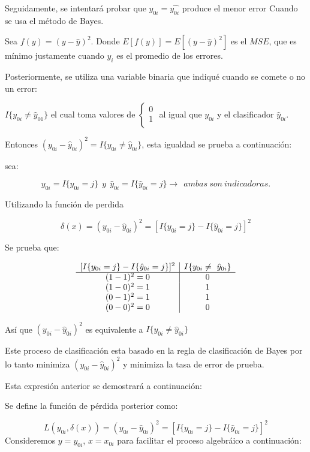 \documentclass[
  12pt,
  letterpaper,
]{article}
\begin{document}
Seguidamente, se intentará probar que \(y_{0i} = \hat{y_{0i}}\) produce
el menor error Cuando se usa el método de Bayes.

Sea \(f(y) = (y - \hat{y})^2\). Donde \(E[f(y)] = E[(y - \hat{y})^2]\)
es el \(MSE\), que es mínimo justamente cuando \(y_i\) es el promedio de
los errores.

Posteriormente, se utiliza una variable binaria que indiqué cuando se
comete o no un error:

\(I\{y_{0i} \neq \hat{y}_{01}\}\) el cual toma valores de
\(\left\{ \begin{aligned} 0\\ 1\\ \end{aligned} \right.\) al igual que
\(y_{0i}\) y el clasificador \(\hat{y}_{0i}\).

Entonces \((y_{0i} - \hat{y}_{0i})^2 = I\{y_{0i} \neq \hat{y}_{0i}\}\),
esta igualdad se prueba a continuación:

sea:

\[y_{0i} = I\{y_{0i} = j\}~~ y ~~ \hat{y}_{0i} = I\{\hat{y}_{0i} = j\} \longrightarrow ~~ ambas~ son ~indicadoras.\]

Utilizando la función de perdida

\[\delta(x) = (y_{0i} - \hat{y}_{0i})^2 = [I\{y_{0i} = j\} - I\{\hat{y}_{0i} = j\}]^2\]

Se prueba que:

\[ \begin{array}{ c | c }
[I\{y_{0i} = j\} - I\{\hat{y}_{0i} = j\}]^2 & I\{y_{0i} \neq\ \hat{y}_{0i}\} \\ 
\hline
(1 - 1)^2 = 0 & 0 \\ 
(1 - 0)^2 = 1 & 1  \\ 
(0 - 1)^2 = 1 & 1  \\ 
(0 - 0)^2 = 0 & 0  \\
\end{array} \]

Así que \((y_{0i} - \hat{y}_{0i})^2\) es equivalente a
\(I\{y_{0i} \neq \hat{y}_{0i} \}\)

Este proceso de clasificación esta basado en la regla de clasificación
de Bayes por lo tanto minimiza \((y_{0i} - \hat{y}_{0i})^2\) y minimiza
la tasa de error de prueba.

Esta expresión anterior se demostrará a continuación:

Se define la función de pérdida posterior como:

\[ L(y_{0i},\delta(x)) = (y_{0i}-\hat{y}_{0i})^2 = [I\{y_{0i}=j\}-I\{\hat{y}_{0i}=j\}]^2 \]
Consideremos \(y = y_{0i}\), \(x= x_{0i}\) para facilitar el proceso
algebráico a continuación:
\end{document}

